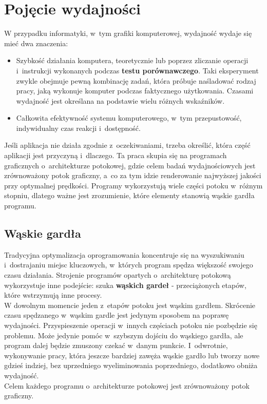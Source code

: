 \documentclass[a4paper,twoside,12pt]{book}
\begin{document}
\section{Pojęcie wydajności}
W przypadku informatyki, w~tym grafiki komputerowej, wydajność wydaje się mieć dwa znaczenia:
\begin{itemize}
    \item Szybkość działania komputera, teoretycznie lub poprzez zliczanie operacji i~instrukcji wykonanych podczas \textbf{testu porównawczego}. Taki eksperyment zwykle obejmuje pewną kombinację zadań, która próbuje naśladować rodzaj pracy, jaką wykonuje komputer podczas faktycznego użytkowania. Czasami wydajność jest określana na podstawie wielu różnych wskaźników.
    \item Całkowita efektywność systemu komputerowego, w~tym przepustowość, indywidualny czas reakcji i~dostępność.
\end{itemize}

Jeśli aplikacja nie działa zgodnie z~oczekiwaniami, trzeba określić, która część aplikacji jest przyczyną i~dlaczego. Ta praca skupia się na programach graficznych o~architekturze potokowej, gdzie celem badań wydajnościowych jest zrównoważony potok graficzny, a~co za tym idzie renderowanie najwyższej jakości przy optymalnej prędkości. Programy wykorzystują wiele części potoku w~różnym stopniu, dlatego ważne jest zrozumienie, które elementy stanowią wąskie gardła programu. \cite{trapp}

\subsection{Wąskie gardła}
Tradycyjna optymalizacja oprogramowania koncentruje się na wyszukiwaniu i~dostrajaniu miejsc kluczowych, w~których program spędza większość swojego czasu działania. Strojenie programów opartych o~architekturę potokową wykorzystuje inne podejście: szuka \textbf{wąskich gardeł} - przeciążonych etapów, które wstrzymują inne procesy. \\

W dowolnym momencie jeden z~etapów potoku jest wąskim gardłem. Skrócenie czasu spędzanego w~wąskim gardle jest jedynym sposobem na poprawę wydajności. Przyspieszenie operacji w~innych częściach potoku nie pozbędzie się problemu. Może jedynie pomóc w~szybszym dojściu do wąskiego gardła, ale program dalej będzie zmuszony czekać w~danym punkcie. I~odwrotnie, wykonywanie pracy, która jeszcze bardziej zawęża wąskie gardło lub tworzy nowe gdzieś indziej, bez uprzedniego wyeliminowania poprzedniego, dodatkowo obniża wydajność. \\
Celem każdego programu o~architekturze potokowej jest zrównoważony potok graficzny. \\
\end{document}
